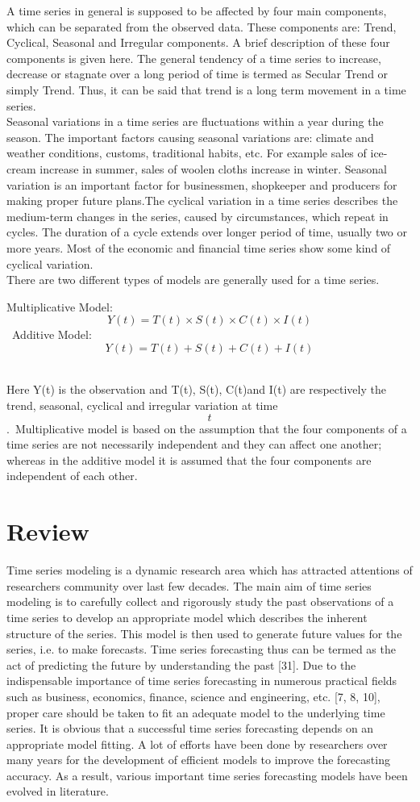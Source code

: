 \documentclass[12pt,a4paper]{article}
\begin{document}
	A time series in general is supposed to be affected by four main components, which can be separated from the observed data. These components are: Trend, Cyclical, Seasonal and Irregular components. A brief description of these four components is given here. The general tendency of a time series to increase, decrease or stagnate over a long period of time is termed as Secular Trend or simply Trend. Thus, it can be said that trend is a long term movement in a time series.\\
	Seasonal variations in a time series are fluctuations within a year during the season. The important factors causing seasonal variations are: climate and weather conditions, customs, traditional habits, etc. For example sales of ice-cream increase in summer, sales of woolen cloths increase in winter. Seasonal variation is an important factor for businessmen, shopkeeper and producers for making proper future plans.The cyclical variation in a time series describes the medium-term changes in the series, caused by circumstances, which repeat in cycles. The duration of a cycle extends over longer period of time, usually two or more years. Most of the economic and financial time series show some kind of cyclical variation. \\
	There are two different types of models are generally used for a time series.\
	
	Multiplicative Model: $$ Y(t) = T(t)× S(t)×C(t)× I(t)$$ \
	Additive Model: $$Y(t) = T(t) + S(t) + C(t) + I(t)$$\
	
	Here Y(t) is the observation and  T(t), S(t), C(t)and I(t) are respectively the trend, seasonal,
	cyclical and irregular variation at time $$t$$.\
	Multiplicative model is based on the assumption that the four components of a time series are
	not necessarily independent and they can affect one another; whereas in the additive model it is
	assumed that the four components are independent of each other.
	\newpage
	\chapter{Review}
	Time series modeling is a dynamic research area which has attracted attentions of researchers community over last few decades. The main aim of time series modeling is to carefully collect and rigorously study the past observations of a time series to develop an appropriate model which describes the inherent structure of the series. This model is then used to generate future values for the series, i.e. to make forecasts. Time series forecasting thus can be termed as the act of predicting the future by understanding the past [31]. Due to the indispensable importance
	of time series forecasting in numerous practical fields such as business, economics, finance, science and engineering, etc. [7, 8, 10], proper care should be taken to fit an adequate model to the underlying time series. It is obvious that a successful time series forecasting depends on an appropriate model fitting. A lot of efforts have been done by researchers over many years for the development of efficient models to improve the forecasting accuracy. As a result, various important time series forecasting models have been evolved in literature.\
	
\end{document}
